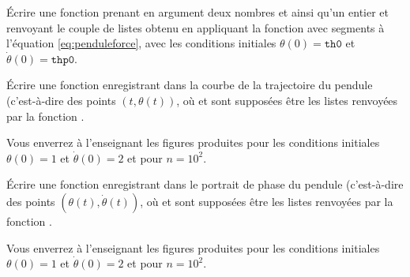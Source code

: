 \medskip

\question{\label{qu:odeintf}} \'Ecrire une fonction  prenant en argument deux nombres  et  ainsi qu'un entier  et renvoyant le couple de listes   obtenu en appliquant la fonction  avec  segments à l'équation \eqref{eq:penduleforce}, avec les conditions initiales  $ \theta(0) = \texttt{th0}$ et $\dot{\theta}(0) = \texttt{thp0}$.

\medskip{}

\question{}\label{qu:trace_trajectoire_odeint} Écrire une fonction  enregistrant dans  la courbe de la trajectoire du pendule (c'est-à-dire des points $(t,\theta(t))$, où  et  sont supposées être les listes renvoyées par la fonction .

Vous enverrez à l'enseignant les figures produites pour les conditions initiales $\theta(0) = 1$ et $\dot{\theta}(0) = 2$ et pour $n=10^2$. 

\medskip{}

\question{}\label{qu:trace_phase_odeint} Écrire une fonction  enregistrant dans  le portrait de phase du pendule (c'est-à-dire des points $(\theta(t),\dot{\theta}(t))$, où  et  sont supposées être les listes renvoyées par la fonction .

Vous enverrez à l'enseignant les figures produites pour les conditions initiales $\theta(0) = 1$ et $\dot{\theta}(0) = 2$ et pour $n=10^2$. 